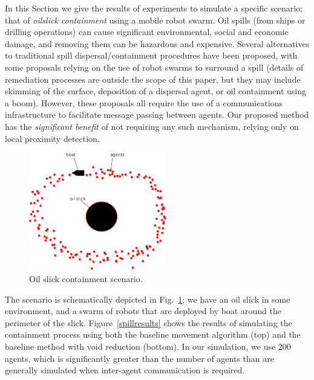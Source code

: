 \documentclass[letterpaper]{article}
\begin{document}
In this Section we give the results of experiments to simulate a specific scenario; that of {\it oilslick containment} using a mobile robot swarm. Oil spills (from ships or drilling operations) can cause significant environmental, social and economic damage, and removing them can be hazardous and expensive. Several alternatives to traditional spill dispersal/containment procedures have been proposed, with some proposals relying on the use of robot swarms to surround a spill \cite{fritsch2007control,kakalis2008robotic,ZFG:13} (details of remediation processes are outside the scope of this paper, but they may include skimming of the surface, deposition of a dispersal agent, or oil containment using a boom). However, these proposals all require the use of a communications infrastructure to facilitate message passing between agents. Our proposed method has the {\it significant benefit} of not requiring any such mechanism, relying only on local proximity detection.


 \begin{figure}
 \begin{center}
 \includegraphics[width=6cm]{figures/OilSlick}
 \end{center}
 \caption{Oil slick containment scenario. \label{voids:OilSlick}}
 \end{figure}

%

The scenario is schematically depicted in Fig.~\ref{voids:OilSlick}; we have an oil slick in some environment, and a swarm of robots that are deployed by boat around the perimeter of the slick.
Figure~\ref{spillresults} shows the results of simulating the containment process using both the baseline movement algorithm (top) and the baseline method with void reduction (bottom). In our simulation, we use 200 agents, which is significantly greater than the number of agents than are generally simulated when inter-agent communication is required.
\end{document}
